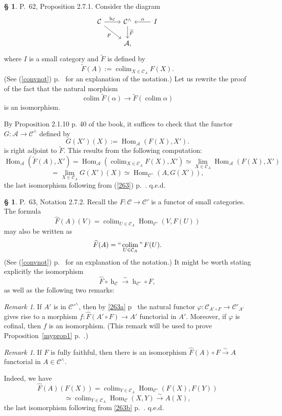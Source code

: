 \documentclass[12pt]{article}
\theoremstyle{remark}
\newtheorem{rk}[thm]{Remark}
\theoremstyle{definition}
\newtheorem{s}[thm]{\S}
\newcommand{\cc}{\mathcal}
\newcommand{\A}{\mathcal A}
\newcommand{\C}{\mathcal C}
\newcommand{\xr}{\xrightarrow}
\newcommand{\cn}{(See (\ref{convnot}) p.~\pageref{convnot} for an explanation of the notation.) }
\DeclareMathOperator*{\coli}{colim}
\DeclareMathOperator*{\icolim}{``\coli"}
\DeclareMathOperator{\hy}{h}
\DeclareMathOperator{\Hom}{Hom}%
\begin{document}
%
%
\begin{s}\label{c271b}
P.~62, Proposition 2.7.1. Consider the diagram 
$$
\begin{tikzcd}
\C\ar{r}{\hy_\C}\ar{dr}[swap]{F}&\C^\wedge\ar{d}{\widetilde F}&I\ar{l}[swap]{\alpha}\\
&\A,
\end{tikzcd}
$$
where $I$ is a small category and $\widetilde F$ is defined by 
$$
\widetilde F(A):=\coli_{X\in\C_A}F(X). 
$$
\cn Let us rewrite the proof of the fact that the natural morphism 
%
$$
\coli\widetilde F(\alpha)\to
\widetilde F\left(\coli\alpha\right) 
$$ 
%
is an isomorphism. 

By Proposition 2.1.10 p. 40 of the book, it suffices to check that the functor $G:\A\to\C^\wedge$ defined by 
$$
G(X')(X):=\Hom_{\A}(F(X),X').
$$ 
is right adjoint to $\widetilde F$. This results from the following computation: 
$$
\Hom_{\A}\left(\widetilde F(A),X'\right)=
\Hom_{\A}\left(\coli_{X\in\C_A}F(X),X'\right)\simeq 
\lim_{X\in\C_A}\Hom_{\A}(F(X),X')
$$
$$
=\lim_{X\in\C_A}G(X')(X)\simeq\Hom_{\C^\wedge}(A,G(X')), 
$$ 
the last isomorphism following from (\ref{263}) p.~\pageref{263}. q.e.d.
\end{s}
%
%
\begin{s} 
P.~63, Notation 2.7.2. Recall the $F:\C\to\C'$ is a functor of small categories. The formula 
$$
\widehat F(A)(V)=\coli_{U\in\C_A}\Hom_{\C'}(V,F(U))
$$
may also be written as 
$$
\widehat F(A)=\icolim_{U\in\C_A}F(U).
$$
\cn It might be worth stating explicitly the isomorphism 
$$
\widehat F\circ\hy_\C\xr\sim\hy_{\C'}\circ F,
$$
as well as the following two remarks:

\begin{rk}\label{cof}
If $A'$ is in $\cc C'^\wedge$, then by \eqref{263a} p~\pageref{263a} the natural functor $\varphi:\cc C_{A'\circ F}\to\cc C'_{A'}$ gives rise to a morphism $f:\widehat F(A'\circ F)\to A'$ functorial in $A'$. Moreover, if $\varphi$ is cofinal, then $f$ is an isomorphism. (This remark will be used to prove Proposition~\ref{myprop1} p.~\pageref{myprop1}.)
\end{rk}

\begin{rk}
If $F$ is fully faithful, then there is an isomorphism $\widehat F(A)\circ F\xr\sim A$ functorial in $A\in\C^\wedge$.
\end{rk} 
\noindent Indeed, we have 
$$
\widehat F(A)(F(X))=\coli_{Y\in\C_A}\Hom_{\C'}(F(X),F(Y))
$$
$$
\simeq\coli_{Y\in\C_A}\Hom_\C(X,Y)\xr\sim A(X),
$$
the last isomorphism following from \eqref{263b} p.~\pageref{263b}. q.e.d.
\end{s}
\end{document}
